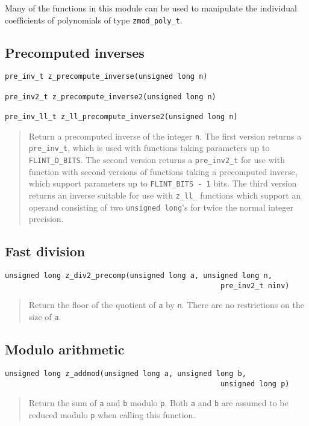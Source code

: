 \documentclass[a4paper,10pt]{article}
\newcommand{\code}{\lstinline}
\begin{document}
Many of the functions in this module can be used to manipulate the individual coefficients of polynomials of type \code{zmod_poly_t}.

\subsection{Precomputed inverses}

\begin{lstlisting}
pre_inv_t z_precompute_inverse(unsigned long n)

pre_inv2_t z_precompute_inverse2(unsigned long n)

pre_inv_ll_t z_ll_precompute_inverse2(unsigned long n)
\end{lstlisting}
\begin{quote}
Return a precomputed inverse of the integer \code{n}. The first version returns a \code{pre_inv_t}, which is used with functions taking parameters up to \code{FLINT_D_BITS}. The second version returns a \code{pre_inv2_t} for use with function with second versions of functions taking a precomputed inverse, which support parameters up to \code{FLINT_BITS - 1} bits. The third version returns an inverse suitable for use with \code{z_ll_} functions which support an operand consisting of two \code{unsigned long}'s for twice the normal integer precision.
\end{quote}

\subsection{Fast division}

\begin{lstlisting}
unsigned long z_div2_precomp(unsigned long a, unsigned long n, 
                                                  pre_inv2_t ninv)
\end{lstlisting}
\begin{quote}
Return the floor of the quotient of \code{a} by \code{n}. There are no restrictions on the size of \code{a}.
\end{quote}

\subsection{Modulo arithmetic}

\begin{lstlisting}
unsigned long z_addmod(unsigned long a, unsigned long b, 
                                                  unsigned long p)
\end{lstlisting}
\begin{quote}
Return the sum of \code{a} and \code{b} modulo \code{p}. Both \code{a} and \code{b} are assumed to be reduced modulo \code{p} when calling this function. 
\end{quote}
\end{document}
